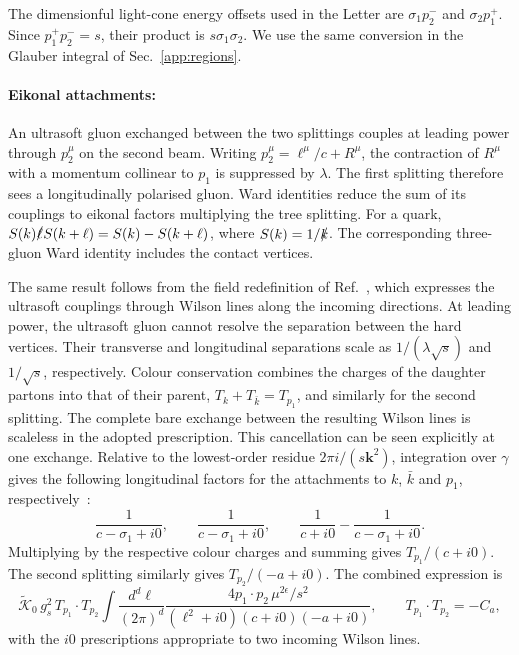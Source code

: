 \documentclass[%
 onecolumn,
 superscriptaddress,
 preprintnumbers,
 nofootinbib,
 amsmath,amssymb,
 aps,
 prl,
]{revtex4-2}
\newcommand{\kk}{\boldsymbol k}
\begin{document}
The dimensionful light-cone energy offsets used
in the Letter are $\sigma_1p_2^-$ and
$\sigma_2p_1^+$. Since $p_1^+p_2^-=s$,
their product is $s\sigma_1\sigma_2$.
We use the same conversion in the Glauber
integral of Sec.~\ref{app:regions}.

\paragraph{Eikonal attachments: }
An ultrasoft gluon exchanged between the two
splittings couples at leading power through
$p_2^\mu$ on the second beam.
Writing
$p_2^\mu=\ell^\mu/c+R^\mu$, the contraction
of $R^\mu$ with a momentum collinear to $p_1$
is suppressed by $\lambda$.
The first splitting
therefore sees a longitudinally polarised gluon.
Ward identities reduce the sum of its couplings
to eikonal factors multiplying the tree splitting.
For a quark,
$S(k)\slashed\ell S(k+\ell)=S(k)-S(k+\ell)$,
where $S(k)=1/\slashed k$. The corresponding
three-gluon Ward identity includes the contact
vertices.

The same result follows from the field
redefinition of Ref.~\cite{Bauer:2001yt},
which expresses the ultrasoft couplings through
Wilson lines along the incoming directions.
At leading power, the ultrasoft gluon cannot
resolve the separation between the hard vertices.
Their transverse and longitudinal separations
scale as $1/(\lambda\sqrt{s})$ and $1/\sqrt{s}$,
respectively. Colour conservation combines the
charges of the daughter partons into that of
their parent,
$T_k+T_{\bar k}=T_{p_1}$,
and similarly for the second splitting.
The complete bare exchange between the
resulting Wilson lines is scaleless in the
adopted prescription.
%
This cancellation can be seen explicitly at
one exchange. Relative to the lowest-order
residue $2\pi i/(s\kk^2)$, integration over
$\gamma$ gives the following longitudinal
factors for the attachments to $k$,
$\bar k$ and $p_1$, respectively~\cite{Gaunt:2011xd}:
\begin{equation}
\frac1{c-\sigma_1+i0},\qquad
\frac1{c-\sigma_1+i0},\qquad
\frac1{c+i0}-\frac1{c-\sigma_1+i0}.
\label{eq:usattach}
\end{equation}
Multiplying by the respective colour charges
and summing gives $T_{p_1}/(c+i0)$.
The second splitting similarly gives
$T_{p_2}/(-a+i0)$. The combined expression is
\begin{equation}
\widetilde{\mathcal K}_0\,g_s^2\,T_{p_1}\!\cdot T_{p_2}
\int\frac{d^d\ell}{(2\pi)^d}
\frac{4p_1\cdot p_2\,\mu^{2\epsilon}/s^2}{(\ell^2+i0)(c+i0)(-a+i0)},
\qquad T_{p_1}\!\cdot T_{p_2}=-C_a,
\label{eq:usscaleless}
\end{equation}
with the $i0$ prescriptions appropriate to
two incoming Wilson lines.
\end{document}
